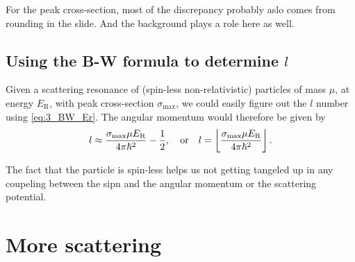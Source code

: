 \documentclass[11pt,letter, swedish, english
]{article}
\begin{document}
For the peak cross-section, most of the discrepancy probably aslo
comes from rounding in the slide. And the background plays a role here
as well. 

\subsection{Using the B-W formula to determine $l$}
\newcommand{\ER}{E_{\text{R}}}
Given a scattering resonance of (spin-less non-relativistic) particles
of mass $\mu$, at energy $\ER$, with peak cross-section $\sigma_{\max}$, we could
easily figure out the $l$ number using \eqref{eq:3_BW_Er}. The angular
momentum would therefore be given by
\begin{equation}
l\approx\frac{\sigma_{\max} \mu \ER}{4\pi\hbar^2} - \frac{1}{2}
\qcomma\text{or}\quad
l=\left\lfloor\frac{\sigma_{\max} \mu \ER}{4\pi\hbar^2}\right\rfloor.
\end{equation}

The fact that the particle is spin-less helps us not getting tangeled
up in any coupeling between the sipn and the angular momentum or the
scattering potential.






\section{More scattering}
\end{document}
